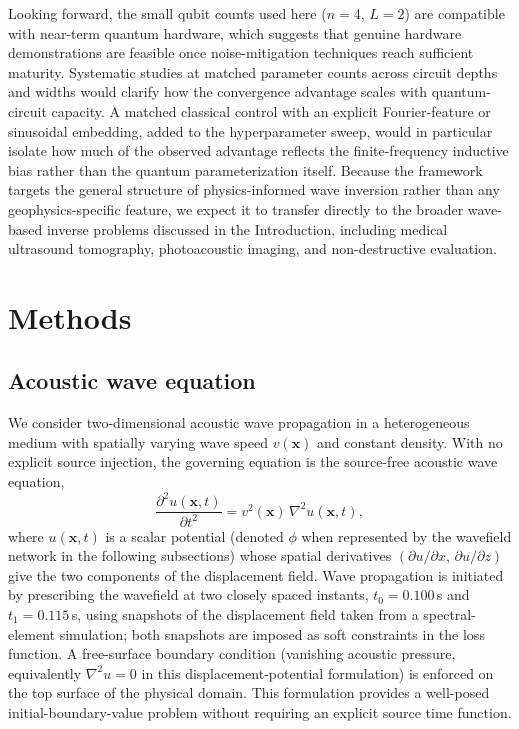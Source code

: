 \documentclass[11pt,a4paper]{article}
\begin{document}
Looking forward, the small qubit counts used here ($n=4$, $L=2$) are compatible with near-term quantum hardware, which suggests that genuine hardware demonstrations are feasible once noise-mitigation techniques reach sufficient maturity. Systematic studies at matched parameter counts across circuit depths and widths would clarify how the convergence advantage scales with quantum-circuit capacity. A matched classical control with an explicit Fourier-feature or sinusoidal embedding, added to the hyperparameter sweep, would in particular isolate how much of the observed advantage reflects the finite-frequency inductive bias rather than the quantum parameterization itself. Because the framework targets the general structure of physics-informed wave inversion rather than any geophysics-specific feature, we expect it to transfer directly to the broader wave-based inverse problems discussed in the Introduction, including medical ultrasound tomography, photoacoustic imaging, and non-destructive evaluation.

\section{Methods}\label{sec:method}

\subsection{Acoustic wave equation}
\label{sec:methods_wave}

We consider two-dimensional acoustic wave propagation in a heterogeneous medium with spatially varying wave speed $v(\mathbf{x})$ and constant density. With no explicit source injection, the governing equation is the source-free acoustic wave equation,
\begin{equation}
\frac{\partial^{2} u(\mathbf{x},t)}{\partial t^{2}}
= v^{2}(\mathbf{x})\,\nabla^{2} u(\mathbf{x},t),
\label{eq:acoustic_wave}
\end{equation}
where $u(\mathbf{x},t)$ is a scalar potential (denoted $\phi$ when represented by the wavefield network in the following subsections) whose spatial derivatives $(\partial u/\partial x,\, \partial u/\partial z)$ give the two components of the displacement field. Wave propagation is initiated by prescribing the wavefield at two closely spaced instants, $t_0 = 0.100$\,s and $t_1 = 0.115$\,s, using snapshots of the displacement field taken from a spectral-element simulation; both snapshots are imposed as soft constraints in the loss function. A free-surface boundary condition (vanishing acoustic pressure, equivalently $\nabla^2 u = 0$ in this displacement-potential formulation) is enforced on the top surface of the physical domain. This formulation provides a well-posed initial-boundary-value problem without requiring an explicit source time function.
\end{document}
